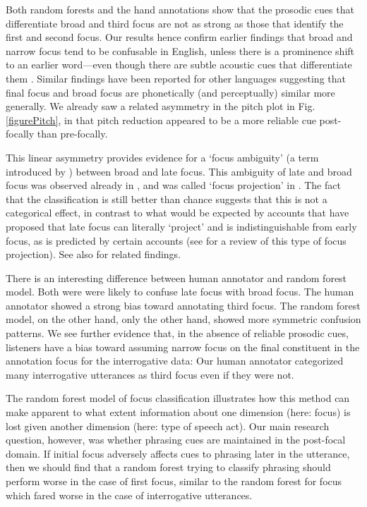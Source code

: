 \documentclass[preprint,review,12pt,authoryear,times]{elsarticle}
\begin{document}
Both random forests and the hand annotations show that the prosodic cues that differentiate broad and third focus are not as strong as those that identify the first and second focus. Our results hence confirm earlier findings that broad and narrow focus tend to be confusable in English, unless there is a prominence shift to an earlier word---even though there are subtle acoustic cues that differentiate them \citep{gusse83}. Similar findings have been reported for other languages \citep{botin99,xu12} suggesting that final focus and broad focus are phonetically (and perceptually) similar more generally.  We already saw a related asymmetry in the pitch plot in Fig. \ref{figurePitch}, in that pitch reduction appeared to be a more reliable cue post-focally than pre-focally. 

This linear asymmetry provides evidence for a `focus ambiguity' (a term introduced by \citealt{jacob91c}) between broad and late focus. This ambiguity of late and broad focus was observed already in \citet{choms71}, and was called `focus projection' in \citet{hohle82}. The fact that the classification is still better than chance suggests that this is not a categorical effect, in contrast to what would be expected by accounts that have proposed that late focus can literally `project' and is indistinguishable from early focus, as is predicted by certain accounts \citep[e.g.][]{selki95} (see  \citealt[see][]{arreg16} for a review of this type of focus projection). See also \citet[][]{breenetal10} for related findings. 

There is an interesting difference between human annotator and random forest model. Both were were likely to confuse late focus with broad focus. The human annotator showed a strong bias toward annotating third focus. The random forest model, on the other hand, only the other hand, showed more symmetric confusion patterns. We see further evidence that, in the absence of reliable prosodic cues, listeners have a bias toward assuming narrow focus on the final constituent in the annotation focus for the interrogative data: Our human annotator categorized many interrogative utterances as third focus even if they were not. 

The random forest model of focus classification illustrates how this method can make apparent to what extent information about one dimension (here: focus) is lost given another dimension (here: type of speech act). Our main research question, however, was whether phrasing cues are maintained in the post-focal domain. If initial focus adversely affects cues to phrasing later in the utterance, then we should find that a random forest trying to classify phrasing should perform worse in the case of first focus, similar to the random forest for focus which fared worse in the case of interrogative utterances. 
\end{document}
